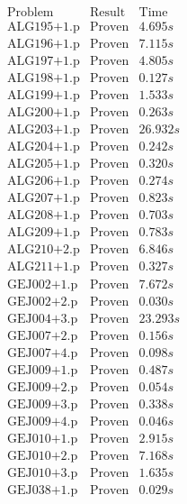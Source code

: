\documentclass[a4paper,11pt]{report}
\theoremstyle{definition}
\theoremstyle{definition}
\theoremstyle{definition}
\theoremstyle{definition}
\theoremstyle{definition}
\theoremstyle{definition}
\theoremstyle{definition}
\begin{document}
	\begin{minipage}{0.45\textwidth}
		\[\begin{matrix}
			\text{Problem}&\text{Result}&\text{Time}\\
			\text{ALG195+1.p}&\text{Proven}& 4.695 s\\
			\text{ALG196+1.p}&\text{Proven}& 7.115 s\\
			\text{ALG197+1.p}&\text{Proven}& 4.805 s\\
			\text{ALG198+1.p}&\text{Proven}& 0.127 s\\
			\text{ALG199+1.p}&\text{Proven}& 1.533 s\\
			\text{ALG200+1.p}&\text{Proven}& 0.263 s\\
			\text{ALG203+1.p}&\text{Proven}& 26.932 s\\
			\text{ALG204+1.p}&\text{Proven}& 0.242 s\\
			\text{ALG205+1.p}&\text{Proven}& 0.320 s\\
			\text{ALG206+1.p}&\text{Proven}& 0.274 s\\
			\text{ALG207+1.p}&\text{Proven}& 0.823 s\\
			\text{ALG208+1.p}&\text{Proven}& 0.703 s\\
			\text{ALG209+1.p}&\text{Proven}& 0.783 s\\
			\text{ALG210+2.p}&\text{Proven}& 6.846 s\\
			\text{ALG211+1.p}&\text{Proven}& 0.327 s\\
			\text{GEJ002+1.p}&\text{Proven}& 7.672 s\\
			\text{GEJ002+2.p}&\text{Proven}& 0.030 s\\
			\text{GEJ004+3.p}&\text{Proven}& 23.293 s\\
			\text{GEJ007+2.p}&\text{Proven}& 0.156 s\\
			\text{GEJ007+4.p}&\text{Proven}& 0.098 s\\
			\text{GEJ009+1.p}&\text{Proven}& 0.487 s\\
			\text{GEJ009+2.p}&\text{Proven}& 0.054 s\\
			\text{GEJ009+3.p}&\text{Proven}& 0.338 s\\
			\text{GEJ009+4.p}&\text{Proven}& 0.046 s\\
			\text{GEJ010+1.p}&\text{Proven}& 2.915 s\\
			\text{GEJ010+2.p}&\text{Proven}& 7.168 s\\
			\text{GEJ010+3.p}&\text{Proven}& 1.635 s\\
			\text{GEJ038+1.p}&\text{Proven}& 0.029 s\\

\end{matrix}\]
\end{minipage}
\end{document}
